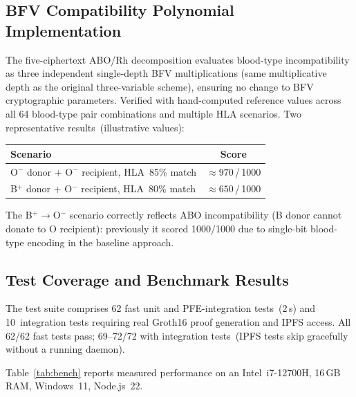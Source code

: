 \documentclass[10pt,twocolumn,a4paper]{article}
\begin{document}
\subsection{BFV Compatibility Polynomial Implementation}

The five-ciphertext ABO/Rh decomposition evaluates blood-type incompatibility as
three independent single-depth BFV multiplications (same multiplicative depth as the
original three-variable scheme), ensuring no change to BFV cryptographic parameters.
Verified with hand-computed reference values across all 64 blood-type pair
combinations and multiple HLA scenarios. Two representative results~(illustrative
values):

\begin{center}
\scriptsize
\begin{tabularx}{0.92\columnwidth}{>{\raggedright\arraybackslash}X c}
\toprule
\textbf{Scenario} & \textbf{Score} \\
\midrule
O$^-$ donor + O$^-$ recipient, HLA~85\% match & $\approx\!970$\,/\,1000 \\
B$^+$ donor + O$^-$ recipient, HLA~80\% match & $\approx\!650$\,/\,1000 \\
\bottomrule
\end{tabularx}
\end{center}

\noindent The B$^+\to$O$^-$ scenario correctly reflects ABO incompatibility (B donor
cannot donate to O recipient): previously it scored 1000/1000 due to single-bit
blood-type encoding in the baseline approach.

\subsection{Test Coverage and Benchmark Results}

The test suite comprises 62 fast unit and PFE-integration tests~(2\,s) and
10~integration tests requiring real Groth16 proof generation and IPFS access.
All 62/62 fast tests pass; 69--72/72 with integration tests~(IPFS tests skip
gracefully without a running daemon).

Table~\ref{tab:bench} reports measured performance on an Intel~i7-12700H,
16\,GB RAM, Windows~11, Node.js~22.
\end{document}
